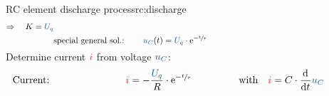{\begin{expl}{RC element discharge process}{rc:discharge}
\begin{align*}
                    \Rightarrow\quad K = \ecv{U_q}\\
            &\text{special general sol.:}&&&
                \ecv{u_C}(t) &= \ecv{U_q} \cdot  \mathrm{e}^{-\sfrac{t}{\tau}}
            \\[-15pt]&\hphantom{R1oooooooooooo}&&&\hphantom{L3ooo}&\hphantom{R3oooooooooooooooo}&&&&\hphantom{R5oooooooooooooooooooooo}\nonumber%
            \end{align*}
        Determine current ${\color{red}i}$ from voltage $\ecv{u_C}$:%
        \begin{align*}%
            &\text{Current:}&&&
                \eci{i} &= - \frac{\ecv{U_q}}{R} \cdot \mathrm{e}^{-\sfrac{t}{\tau}} &&&
                &\text{with}\quad \eci{i} = C \cdot \dt \ecv{u_C}
            \\[-15pt]&\hphantom{R1oooooooooooo}&&&\hphantom{L3ooo}&\hphantom{R3oooooooooooooooo}&&&&\hphantom{R5oooooooooooooooooooooo}\nonumber%
        \end{align*}
        \endgroup
    \end{expl}
}%




